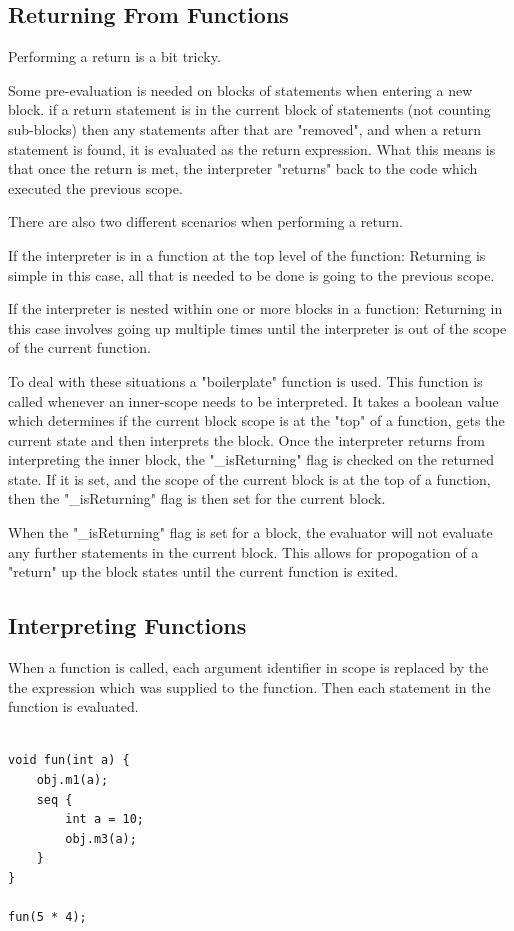\subsection{Returning From Functions}
Performing a return is a bit tricky. 

Some pre-evaluation is needed  on blocks of statements when entering a 
new block. if a return statement is
in the current block of statements (not counting sub-blocks) then
any statements after that are "removed", and when a return statement
is found, it is evaluated as the return expression.
What this means is that once the return is met, the interpreter
"returns" back to the code which executed the previous scope.

There are also two different scenarios when performing a return.

If the interpreter is in a function at the top level of the function:
Returning is simple in this case, all that is needed to be done is
going to the previous scope.

If the interpreter is nested within one or more blocks in a function:
Returning in this case involves going up multiple times until the interpreter
is out of the scope of the current function.

To deal with these situations a "boilerplate" function is used. This function
is called whenever an inner-scope needs to be interpreted. It
takes a boolean value which determines if the current block scope is at
the "top" of a function, gets the current state and then interprets the block.
Once the interpreter returns from interpreting the inner block, the "\_isReturning"
flag is checked on the returned state. If it is set, and the scope
of the current block is at the top of a function, then the "\_isReturning" flag
is then set for the current block.
 
When the "\_isReturning" flag is set for a block, the evaluator will not evaluate
any further statements in the current block. This allows for propogation of a "return"
up the block states until the current function is exited.


\subsection{Interpreting Functions}
When a function is called, each argument identifier in scope
is replaced by the the expression which was supplied to the function.
Then each statement in the function is evaluated.

\begin{lstlisting}[style=myGPC]

void fun(int a) {
    obj.m1(a);
    seq {
        int a = 10;
        obj.m3(a);
    }    
}

fun(5 * 4);

\end{lstlisting}

